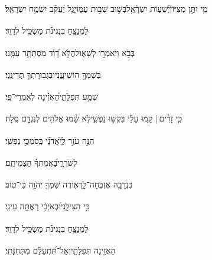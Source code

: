 \documentclass[12pt]{article}
\newcommand{\loc}[1]{\textsuperscript{\locf{#1}}}
\begin{document}
{\loc{ ז}~}‏מִ֥י יִתֵּ֣ן מִצִּיּוֹן֮{\hfill}יְשֻׁע֢וֹת יִשְׂרָ֫אֵ֥ל\newline\hspace*{.5em}בְּשׁ֣וּב  שְׁב֣וּת עַמּ֑וֹ{\hfill}יָגֵ֥ל יַ֝עֲקֹ֗ב יִשְׂמַ֥ח יִשְׂרָאֵֽל׃\par\pend

\pstart[\subsection*{\textcolor{red}{פרק נד}}]\label{פרק נד}
{\loc{ א}~}‏לַמְנַצֵּ֥חַ בִּנְגִינֹ֗ת מַשְׂכִּ֥יל לְדָוִֽד׃\par

{\loc{ ב}~}‏בְּבֹ֣א  וַיֹּאמְר֣וּ לְשָׁא֑וּל{\hfill}הֲלֹ֥א דָ֝וִ֗ד מִסְתַּתֵּ֥ר עִמָּֽנוּ׃\par

{\loc{ ג}~}‏ בְּשִׁמְךָ֣ הוֹשִׁיעֵ֑נִי{\hfill}וּבִגְבוּרָתְךָ֥ תְדִינֵֽנִי׃\par

{\loc{ ד}~}‏ שְׁמַ֣ע תְּפִלָּתִ֑י{\hfill}הַ֝אֲזִ֗ינָה לְאִמְרֵי־פִֽי׃\par

{\loc{ ה}~}‏כִּ֤י זָרִ֨ים | {\hfill}קָ֤מוּ עָלַ֗י\newline\hspace*{.5em} בִּקְשׁ֣וּ נַפְשִׁ֑י{\hfill}לֹ֤א שָׂ֨מוּ אֱלֹהִ֖ים לְנֶגְדָּ֣ם סֶֽלָה׃\par

{\loc{ ו}~}‏הִנֵּ֣ה  עֹזֵ֣ר לִ֑י{\hfill}אֲ֝דֹנָ֗י בְּֽסֹמְכֵ֥י נַפְשִֽׁי׃\par

{\loc{ ז}~}‏  לְשֹׁרְרָ֑י{\hfill}בַּ֝אֲמִתְּךָ֗ הַצְמִיתֵֽם׃\par

{\loc{ ח}~}‏בִּנְדָבָ֥ה אֶזְבְּחָה־לָּ֑ךְ{\hfill}א֤וֹדֶה שִּׁמְךָ֖ יְהֹוָ֣ה כִּי־טֽוֹב׃\par

{\loc{ ט}~}‏כִּ֣י  הִצִּילָ֑נִי{\hfill}וּ֝בְאֹיְבַ֗י רָאֲתָ֥ה עֵינִֽי׃\par\pend
\ledpb
\pstart[\subsection*{\textcolor{red}{פרק נה}}]\label{פרק נה}
{\loc{ א}~}‏לַמְנַצֵּ֥חַ בִּנְגִינֹ֗ת מַשְׂכִּ֥יל לְדָוִֽד׃\par

{\loc{ ב}~}‏הַאֲזִ֣ינָה  תְּפִלָּתִ֑י{\hfill}וְאַל־תִּ֝תְעַלַּ֗ם מִתְּחִנָּתִֽי׃\par
\end{document}
